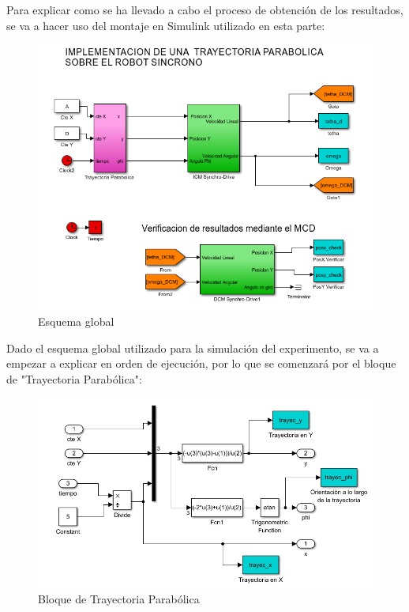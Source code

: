 \documentclass[a4paper,twoside]{article}
\begin{document}
	Para explicar como se ha llevado a cabo el proceso de obtención de los resultados, se va a hacer uso del montaje en Simulink utilizado en esta parte:
	
	\begin{figure}[H]
		\centering
		\includegraphics[width=1\textwidth]{simulink_MCI_1}
		\caption{Esquema global}
	\end{figure}
	
	Dado el esquema global utilizado para la simulación del experimento, se va a empezar a explicar en orden de ejecución, por lo que se comenzará por el bloque de "Trayectoria Parabólica":
	
	\begin{figure}[H]
		\centering
		\includegraphics[width=1\textwidth]{simulink_MCI_2}
		\caption{Bloque de Trayectoria Parabólica}
	\end{figure}
\end{document}
